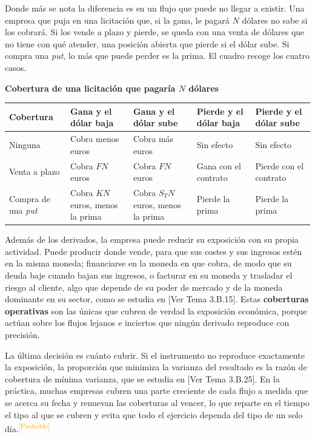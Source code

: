 \documentclass[10pt,a4paper]{article}
\newcommand{\authorfont}[1]{{\fontfamily{EBGaramond-TLF}\selectfont #1}}
\begin{document}
Donde más se nota la diferencia es en un flujo que puede no llegar a existir. Una empresa que puja en una licitación que, si la gana, le pagará $N$ dólares no sabe si los cobrará. Si los vende a plazo y pierde, se queda con una venta de dólares que no tiene con qué atender, una posición abierta que pierde si el dólar sube. Si compra una \textit{put}, lo más que puede perder es la prima. El cuadro recoge los cuatro casos.

\begin{center}
{\small\textbf{Cobertura de una licitación que pagaría $N$ dólares}}\par\vspace{0.4em}
\small
\renewcommand{\arraystretch}{1.4}
\begin{tabular}{|p{2.6cm}|p{2.7cm}|p{2.7cm}|p{2.6cm}|p{2.6cm}|}
\hline
\textbf{Cobertura} & \textbf{Gana y el dólar baja} & \textbf{Gana y el dólar sube} & \textbf{Pierde y el dólar baja} & \textbf{Pierde y el dólar sube} \tabularnewline
\hline
Ninguna & Cobra menos euros & Cobra más euros & Sin efecto & Sin efecto \tabularnewline
\hline
Venta a plazo & Cobra $FN$ euros & Cobra $FN$ euros & Gana con el contrato & Pierde con el contrato \tabularnewline
\hline
Compra de una \textit{put} & Cobra $KN$ euros, menos la prima & Cobra $S_TN$ euros, menos la prima & Pierde la prima & Pierde la prima \tabularnewline
\hline
\end{tabular}
\end{center}

Además de los derivados, la empresa puede reducir su exposición con su propia actividad. Puede producir donde vende, para que sus costes y sus ingresos estén en la misma moneda; financiarse en la moneda en que cobra, de modo que su deuda baje cuando bajan sus ingresos, o facturar en su moneda y trasladar el riesgo al cliente, algo que depende de su poder de mercado y de la moneda dominante en su sector, como se estudia en [\authorfont{Ver Tema 3.B.15}]. Estas \textbf{coberturas operativas} son las únicas que cubren de verdad la exposición económica, porque actúan sobre los flujos lejanos e inciertos que ningún derivado reproduce con precisión.

La última decisión es cuánto cubrir. Si el instrumento no reproduce exactamente la exposición, la proporción que minimiza la varianza del resultado es la razón de cobertura de mínima varianza, que se estudia en [\authorfont{Ver Tema 3.B.25}]. En la práctica, muchas empresas cubren una parte creciente de cada flujo a medida que se acerca su fecha y renuevan las coberturas al vencer, lo que reparte en el tiempo el tipo al que se cubren y evita que todo el ejercicio dependa del tipo de un solo día.\textcolor{orange}{\textsuperscript{[Probable]}}
\end{document}
